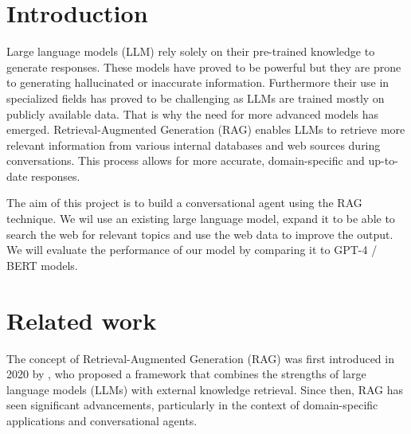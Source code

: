 \documentclass[fleqn,moreauthors,10pt]{ds_report}
\affiliation{\textit{Advisors: Aleš Žagar}}
\begin{document}
\flushbottom 

\maketitle 

\thispagestyle{empty} 


\section*{Introduction}
Large language models (LLM) rely solely on their pre-trained knowledge to generate responses. 
These models have proved to be powerful but they are prone to generating hallucinated or inaccurate information. 
Furthermore their use in specialized fields has proved to be challenging as LLMs are trained mostly on publicly available 
data. That is why the need for more advanced models has emerged. Retrieval-Augmented Generation (RAG) enables LLMs to 
retrieve more relevant information from various internal databases and web sources during conversations. 
This process allows for more accurate, domain-specific and up-to-date responses.

The aim of this project is to build a conversational agent using the RAG technique. We wil use an existing large language model, 
expand it to be able to search the web for relevant topics and use the web data to improve the output. We will evaluate 
the performance of our model by comparing it to GPT-4 / BERT models.



\section*{Related work}
The concept of Retrieval-Augmented Generation (RAG) was first introduced in 2020 by \cite{NEURIPS2020_6b493230}, who proposed a framework that combines the strengths of large language models (LLMs) with external knowledge retrieval. Since then, RAG has seen significant advancements, particularly in the context of domain-specific applications and conversational agents.
\end{document}
